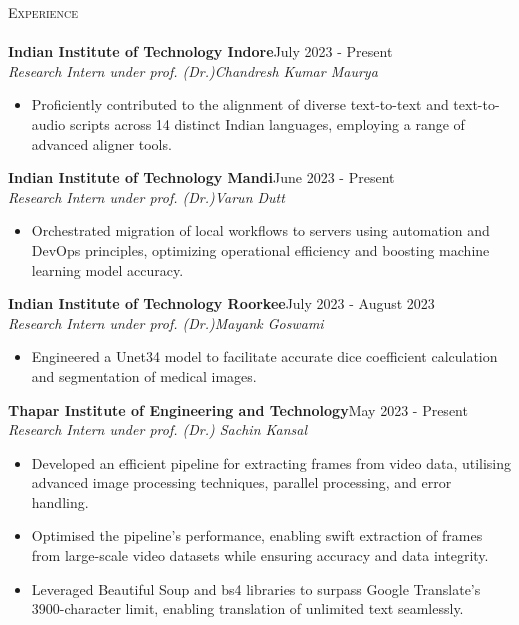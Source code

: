\documentclass[a4paper]{article}
\newcommand{\lineunder} {
    \vspace*{-8pt} \\
    \hspace*{-18pt} \hrulefill \\
}
\newcommand{\header} [1] {
    {\hspace*{-18pt}\vspace*{6pt} \textsc{#1}}
    \vspace*{-6pt} \lineunder
}
\begin{document}
\vspace{0.3mm}
\header{Experience}

{\textbf{Indian Institute of Technology Indore}}\hfill July 2023 - Present \\
 {\textit{Research Intern under prof. (Dr.)Chandresh Kumar Maurya }}  \
\vspace{-2.5mm}
\begin{itemize} 
\item Proficiently contributed to the alignment of diverse text-to-text and text-to-audio scripts across 14 distinct Indian languages, employing a range of advanced aligner tools.  
\end{itemize}

{\textbf{Indian Institute of Technology Mandi}}\hfill June 2023 - Present \\
 {\textit{Research Intern under prof. (Dr.)Varun Dutt }}  \
\vspace{-2.5mm}
\begin{itemize} 
\item Orchestrated migration of local workflows to servers using automation and DevOps principles, optimizing operational efficiency and boosting machine learning model accuracy. 
\end{itemize}

{\textbf{Indian Institute of Technology Roorkee}}\hfill July 2023 - August 2023 \\
 {\textit{Research Intern under prof. (Dr.)Mayank Goswami }}  \
\vspace{-2.5mm}
\begin{itemize} 
\item Engineered a Unet34 model to facilitate accurate dice coefficient calculation and segmentation of medical images.
\end{itemize}

{\textbf{Thapar Institute of Engineering and Technology}}\hfill May 2023 - Present \\
 {\textit{Research Intern under prof. (Dr.) Sachin Kansal }}  \
\vspace{-2.5mm}
\begin{itemize} 
\item Developed an efficient pipeline for extracting frames from video data, utilising advanced image processing techniques, parallel processing, and error handling. 
\vspace{-3.0mm}
\item Optimised the pipeline's performance, enabling swift extraction of frames from large-scale video datasets while ensuring accuracy and data integrity.
\vspace{-3.0mm}
\item Leveraged Beautiful Soup and bs4 libraries to surpass Google Translate's 3900-character limit, enabling translation of unlimited text seamlessly.
\end{itemize}
\end{document}
